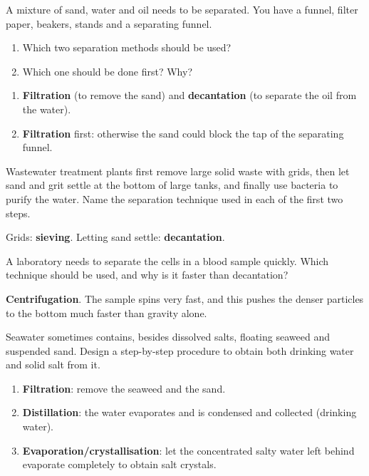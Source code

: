 \begin{exercise}
    A mixture of sand, water and oil needs to be separated. You have a funnel, filter paper, beakers, stands and a separating funnel.
    \begin{enumerate}[label=\letraminuscula]
        \item Which two separation methods should be used?
        \item Which one should be done first? Why?
    \end{enumerate}
    \begin{solu}
        \begin{enumerate}[label=\alph*)]
            \item \textbf{Filtration} (to remove the sand) and \textbf{decantation} (to separate the oil from the water).
            \item \textbf{Filtration} first: otherwise the sand could block the tap of the separating funnel.
        \end{enumerate}
    \end{solu}
\end{exercise}

\begin{exercise}
    Wastewater treatment plants first remove large solid waste with grids, then let sand and grit settle at the bottom of large tanks, and finally use bacteria to purify the water. Name the separation technique used in each of the first two steps.
    \begin{solu}
        Grids: \textbf{sieving}. Letting sand settle: \textbf{decantation}.
    \end{solu}
\end{exercise}

\begin{exercise}
    A laboratory needs to separate the cells in a blood sample quickly. Which technique should be used, and why is it faster than decantation?
    \begin{solu}
        \textbf{Centrifugation}. The sample spins very fast, and this pushes the denser particles to the bottom much faster than gravity alone.
    \end{solu}
\end{exercise}

\begin{exercise}
    Seawater sometimes contains, besides dissolved salts, floating seaweed and suspended sand. Design a step-by-step procedure to obtain both drinking water and solid salt from it.
    \begin{solu}
        \begin{enumerate}
            \item \textbf{Filtration}: remove the seaweed and the sand.
            \item \textbf{Distillation}: the water evaporates and is condensed and collected (drinking water).
            \item \textbf{Evaporation/crystallisation}: let the concentrated salty water left behind evaporate completely to obtain salt crystals.
        \end{enumerate}
    \end{solu}
\end{exercise}

